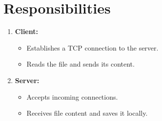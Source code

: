 \documentclass[a4paper,12pt]{article}
\begin{document}
\section*{Responsibilities}
\begin{enumerate}
    \item \textbf{Client:}
    \begin{itemize}
        \item Establishes a TCP connection to the server.
        \item Reads the file and sends its content.
    \end{itemize}
    \item \textbf{Server:}
    \begin{itemize}
        \item Accepts incoming connections.
        \item Receives file content and saves it locally.
    \end{itemize}
\end{enumerate}
\end{document}
